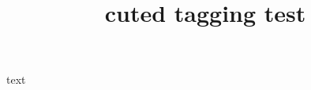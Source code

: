 \documentclass[twocolumn]{article}
\title{cuted tagging test}
\begin{document}
text
\begin{strip}
\kant[3]\footnotemark
\end{strip}
\kant[4-5]
\end{document}
